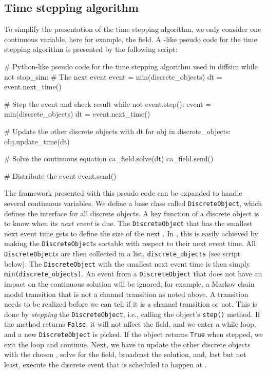 \subsection*{Time stepping algorithm}
\label{sec:hake:event-driven-simulator}
To simplify the presentation of the time stepping algorithm, we only
consider one continuous variable, here for example, the \Ca field. A
-like pseudo code for the time stepping algorithm
is presented by the following script:
\begin{python}
# Python-like pseudo code for the time stepping algorithm used in diffsim
while not stop_sim:
    # The next event
    event = min(discrete_objects)
    dt = event.next_time()

    # Step the event and check result
    while not event.step():
        event = min(discrete_objects)
        dt = event.next_time()

    # Update the other discrete objects with dt
    for obj in discrete_objects:
        obj.update_time(dt)

    # Solve the continuous equation
    ca_field.solve(dt)
    ca_field.send()

    # Distribute the event
    event.send()
\end{python}
The framework presented with this pseudo code can be expanded to
handle several continuous variables. We define a base class called
\texttt{DiscreteObject}, which defines the interface for all discrete
objects. A key function of a discrete object is to know when its
\textit{next event} is due. The \texttt{DiscreteObject} that has the
smallest next event time gets to define the size of the next \Dt. In
, this is easily achieved by making the
\texttt{DiscreteObject}s sortable with respect to their next event
time. All \texttt{DiscreteObject}s are then collected in a list,
\texttt{discrete\_objects} (see script below). The
\texttt{DiscreteObject} with the smallest next event time is then
simply \texttt{min(discrete\_objects)}. An event from a
\texttt{DiscreteObject} that does not have an impact on the continuous
solution will be ignored; for example, a Markov chain model transition
that is not a channel transition as noted above. A transition needs to
be realized before we can tell if it is a channel transition or
not. This is done by \textit{stepping} the \texttt{DiscreteObject},
i.e., calling the object's \texttt{step()} method. If the method
returns \texttt{False}, it will not affect the \Ca field, and we enter
a while loop, and a new \texttt{DiscreteObject} is picked. If the
object returns \texttt{True} when stepped, we exit the loop and
continue. Next, we have to update the other discrete objects with the
chosen \Dt, solve for the \Ca field, broadcast the solution, and, last
but not least, execute the discrete event that is scheduled to happen
at \Dt.\par

